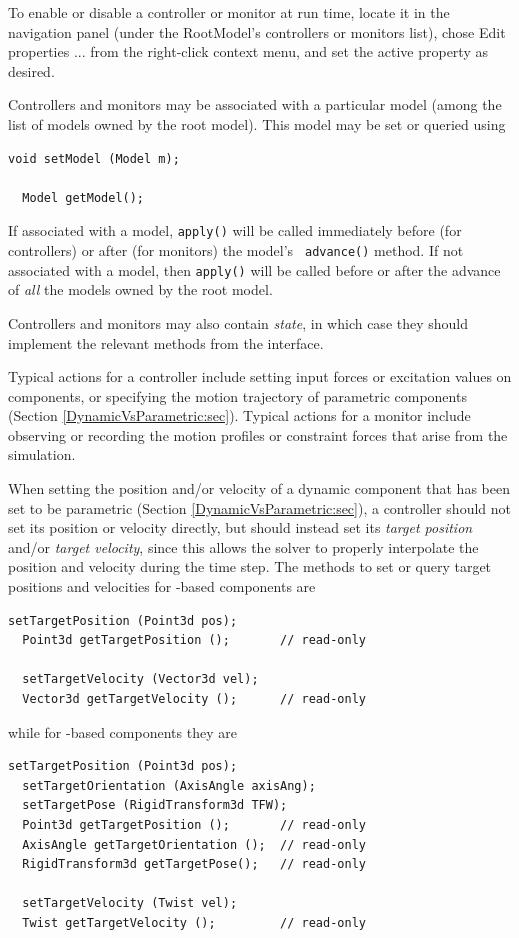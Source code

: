 \begin{sideblock}
To enable or disable a controller or monitor at run time, locate it in
the navigation panel (under the RootModel's {\sf controllers} or {\sf
monitors} list), chose {\sf Edit properties ...} from the right-click
context menu, and set the {\sf active} property as desired.
\end{sideblock}

Controllers and monitors may be associated with a particular model
(among the list of models owned by the root model). This model may be
set or queried using
%
\begin{lstlisting}[]
  void setModel (Model m);

  Model getModel();
\end{lstlisting}
%
If associated with a model, {\tt apply()} will be called immediately
before (for controllers) or after (for monitors) the model's {\tt
advance()} method. If not associated with a model, then {\tt apply()}
will be called before or after the advance of {\it all} the models
owned by the root model.

Controllers and monitors may also contain {\it state}, in which case
they should implement the relevant methods from the
 interface.

Typical actions for a controller include setting input forces or
excitation values on components, or specifying the motion trajectory
of parametric components (Section \ref{DynamicVsParametric:sec}).
Typical actions for a monitor include observing or recording
the motion profiles or constraint forces that arise
from the simulation.

When setting the position and/or velocity of a dynamic component that
has been set to be parametric (Section \ref{DynamicVsParametric:sec}),
a controller should not set its position or velocity directly, but
should instead set its {\it target position} and/or {\it target
velocity}, since this allows the solver to properly interpolate the
position and velocity during the time step. The methods to set or
query target positions and velocities for
-based components are
%
\begin{lstlisting}[]
  setTargetPosition (Point3d pos);
  Point3d getTargetPosition ();       // read-only

  setTargetVelocity (Vector3d vel);
  Vector3d getTargetVelocity ();      // read-only
\end{lstlisting}
%
while for
-based components they are
%
\begin{lstlisting}[]
  setTargetPosition (Point3d pos);
  setTargetOrientation (AxisAngle axisAng);
  setTargetPose (RigidTransform3d TFW);
  Point3d getTargetPosition ();       // read-only
  AxisAngle getTargetOrientation ();  // read-only
  RigidTransform3d getTargetPose();   // read-only

  setTargetVelocity (Twist vel);
  Twist getTargetVelocity ();         // read-only
\end{lstlisting}
%

